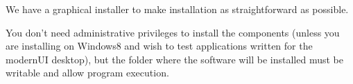 We have a graphical installer to make installation as straightforward as possible. 

You don't need administrative privileges to install the components (unless you are installing on Windows8 and wish to test applications written for the modernUI desktop), but the folder where the software will be installed must be writable and allow program execution.
